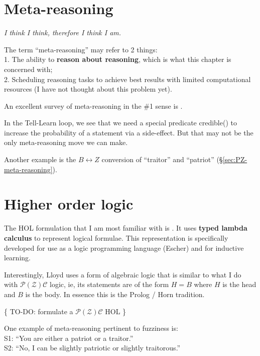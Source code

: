 
\section{Meta-reasoning}
\begin{flushright}
\emph{I think I think, therefore I think I am.}
\end{flushright}

The term ``meta-reasoning'' may refer to 2 things:\\
1. The ability to \textbf{reason about reasoning}, which is what this chapter is concerned with;\\
2. Scheduling reasoning tasks to achieve best results with limited computational resources (I have not thought about this problem yet).

An excellent survey of meta-reasoning in the \#1 sense is \citep*{Constantini2002}.

In the Tell-Learn loop, we see that we need a special predicate credible() to increase the probability of a statement via a side-effect.  But that may not be the only meta-reasoning move we can make.

Another example is the $B \leftrightarrow Z$ conversion of ``traitor'' and ``patriot'' (\S\ref{sec:PZ-meta-reasoning}).

\section{Higher order logic}
\label{sec:HOL}

The HOL formulation that I am most familiar with is \citep*{Lloyd2003}.  It uses \textbf{typed lambda calculus} to represent logical formulae.  This representation is specifically developed for use as a logic programming language (Escher) and for inductive learning.

Interestingly, Lloyd uses a form of algebraic logic that is similar to what I do with $\mathcal{P(Z)C}$ logic, ie, its statements are of the form $H = B$ where $H$ is the head and $B$ is the body.  In essence this is the Prolog / Horn tradition.

\{ TO-DO:  formulate a $\mathcal{P(Z)C}$ HOL \}

\label{sec:PZ-meta-reasoning}

One example of meta-reasoning pertinent to fuzziness is:\\
\hspace*{1cm} S1: ``You are either a patriot or a traitor.''\\
\hspace*{1cm} S2: ``No, I can be slightly patriotic or slightly traitorous.''

